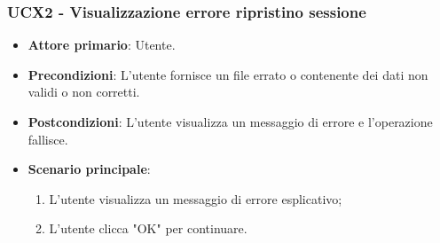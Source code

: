 \subsubsection{UCX2 - Visualizzazione errore ripristino sessione}
\begin{itemize}
	\item \textbf{Attore primario}: Utente.
	\item \textbf{Precondizioni}: L'utente fornisce un file errato o contenente dei dati non validi o non corretti.
	\item \textbf{Postcondizioni}: L'utente visualizza un messaggio di errore e l'operazione fallisce.
	\item \textbf{Scenario principale}:
		\begin{enumerate}
			\item L'utente visualizza un messaggio di errore esplicativo;
			\item L'utente clicca "OK" per continuare.
		\end{enumerate}
\end{itemize}